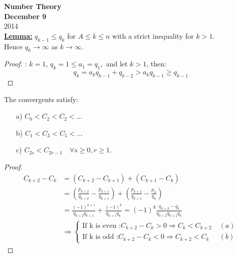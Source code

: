 \documentclass{report}
\begin{document}
\newpage



{\centering
\Large
\textbf{Number Theory}\\
\normalsize
\textbf{December 9}\\
2014\\
}
\vspace{10mm}
\underline{\textbf{Lemma:}}  $q_{k-1}\leq q_k$ for $A\leq k \leq n$ with a strict inequality for $k>1$.\\
														Hence $q_k\longrightarrow \infty$ as $k\longrightarrow \infty$.
\begin{proof}: $k=1$, $q_k=1\leq a_1=q_1,$  and let $k>1$, then:\[q_k=a_kq_{k-1}+q_{k-2}>a_kq_{k-1}\geq q_{k-1}\]
\end{proof}
\begin{thm} The convergents satisfy:
						\begin{itemize}
						\item[a)] $C_0<C_2<C_2<\dots$
						\item[b)] $C_1<C_3<C_5<\dots$
						\item[c)] $C_{2s}<C_{2r-1} \quad \forall s\geq 0, r\geq 1.$
						\end{itemize}
\end{thm}
\begin{proof}
							\[\begin{array}{lcl}
								&C_{k+2}-C_k&=(C_{k+2}-C_{k+1})+(C_{k+1}-C_k)\\
													&& =(\frac{p_{k+2}}{q_{k+2}}-\frac{p_{k+1}}{q_{k+1}})+(\frac{p_{k+1}}{q_{k+1}}-\frac{p_n}{q_n})\\
													&& =\frac{(-1)^{k+1}}{q_{k+2}q_{k+1}}+\frac{(-1)^k}{q_{k+1}q_k}=(-1)^k\frac{q_{k+2}-q_k}{q_{k+2}q_{k+1}q_k}\\
													&& \Rightarrow 	\left\{
																					\begin{array}{lcl}
																					\text{If k is even :} C_{k+2}-C_k>0 \Rightarrow C_k<C_{k+2} \; &(a)&\\
																					\text{If k is odd :} C_{k+2}-C_k<0\Rightarrow C_{k+2}<C_k \; &(b)&
																					\end{array}
																					\right.
								\end{array}\]
\end{proof}
\end{document}
